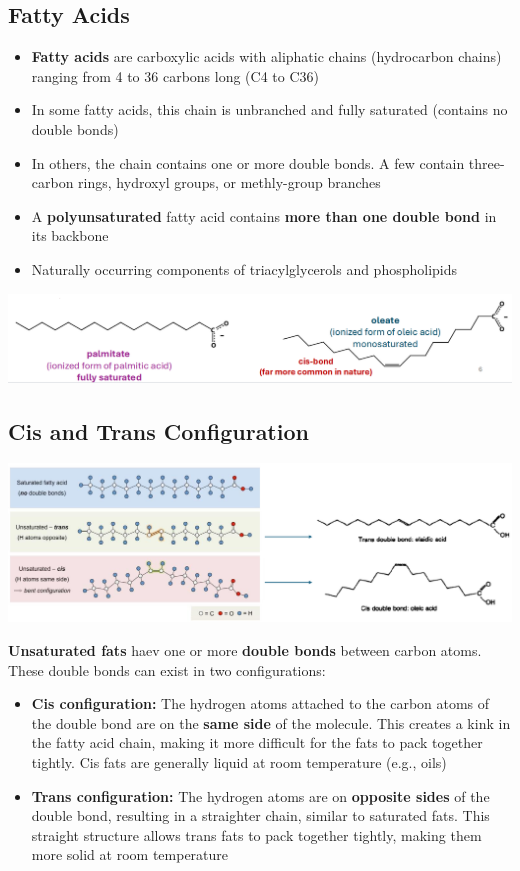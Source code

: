 \documentclass[10pt]{article}
\begin{document}
\subsection*{Fatty Acids}
\begin{itemize}
    \item \textbf{Fatty acids} are carboxylic acids with aliphatic chains (hydrocarbon chains) ranging from 4 to 36 carbons long (C4 to C36)
    \item In some fatty acids, this chain is unbranched and fully saturated (contains no double bonds)
    \item In others, the chain contains one or more double bonds.  A few contain three-carbon rings, hydroxyl groups, or methly-group branches
    \item A \textbf{polyunsaturated} fatty acid contains \textbf{more than one double bond} in its backbone
    \item Naturally occurring components of triacylglycerols and phospholipids
\end{itemize}
\begin{center}
    \includegraphics*[width=\textwidth]{L2_4.png}
\end{center}

\subsection*{Cis and Trans Configuration}
\begin{center}
    \includegraphics*[width=\textwidth]{L2_5.png}
\end{center}
\textbf{Unsaturated fats} haev one or more \textbf{double bonds} between carbon atoms.  These double bonds can exist in two configurations:
\begin{itemize}
    \item \textbf{Cis configuration:} The hydrogen atoms attached to the carbon atoms of the double bond are on the \textbf{same side} of the molecule.  This creates a kink in the fatty acid chain, making it more difficult for the fats to pack together tightly.  Cis fats are generally liquid at room temperature (e.g., oils)
    \item \textbf{Trans configuration:} The hydrogen atoms are on \textbf{opposite sides} of the double bond, resulting in a straighter chain, similar to saturated fats.  This straight structure allows trans fats to pack together tightly, making them more solid at room temperature
\end{itemize}
\end{document}

